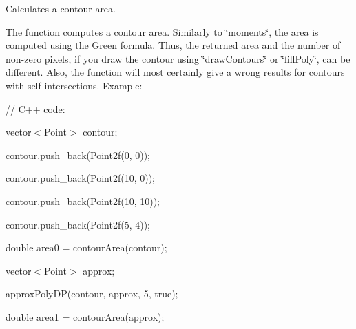Calculates a contour area.

The function computes a contour area. Similarly to \char`\"{}moments\char`\"{}, the area is computed using the Green formula. Thus, the returned area and the number of non-\/zero pixels, if you draw the contour using \char`\"{}draw\+Contours\char`\"{} or \char`\"{}fill\+Poly\char`\"{}, can be different. Also, the function will most certainly give a wrong results for contours with self-\/intersections. Example\+: {\ttfamily }

{\ttfamily }

{\ttfamily }

{\ttfamily // C++ code\+:}

{\ttfamily }

{\ttfamily }

{\ttfamily vector$<$\+Point$>$ contour;}

{\ttfamily }

{\ttfamily }

{\ttfamily contour.\+push\+\_\+back(\+Point2f(0, 0));}

{\ttfamily }

{\ttfamily }

{\ttfamily contour.\+push\+\_\+back(\+Point2f(10, 0));}

{\ttfamily }

{\ttfamily }

{\ttfamily contour.\+push\+\_\+back(\+Point2f(10, 10));}

{\ttfamily }

{\ttfamily }

{\ttfamily contour.\+push\+\_\+back(\+Point2f(5, 4));}

{\ttfamily }

{\ttfamily }

{\ttfamily double area0 = contour\+Area(contour);}

{\ttfamily }

{\ttfamily }

{\ttfamily vector$<$\+Point$>$ approx;}

{\ttfamily }

{\ttfamily }

{\ttfamily approx\+Poly\+D\+P(contour, approx, 5, true);}

{\ttfamily }

{\ttfamily }

{\ttfamily double area1 = contour\+Area(approx);}

{\ttfamily }

{\ttfamily }

